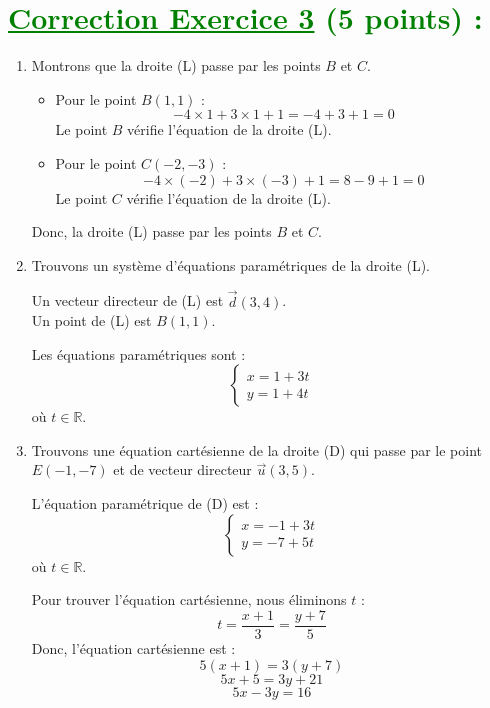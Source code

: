 \documentclass[12pt]{article}
\begin{document}
\section*{\textcolor{green}{\underline{Correction Exercice 3} (5 points) :}}
\begin{enumerate}
    \item Montrons que la droite (L) passe par les points \(B\) et \(C\).
    
    \begin{itemize}
        \item Pour le point \(B(1, 1)\) :
        \[
        -4 \times 1 + 3 \times 1 + 1 = -4 + 3 + 1 = 0
        \]
        Le point \(B\) vérifie l'équation de la droite (L).

        \item Pour le point \(C(-2, -3)\) :
        \[
        -4 \times (-2) + 3 \times (-3) + 1 = 8 - 9 + 1 = 0
        \]
        Le point \(C\) vérifie l'équation de la droite (L).
    \end{itemize}
    Donc, la droite (L) passe par les points \(B\) et \(C\).

    \item Trouvons un système d’équations paramétriques de la droite (L).

    Un vecteur directeur de (L) est \(\vec{d}(3, 4)\).\\
    Un point de (L) est \(B(1, 1)\).

    Les équations paramétriques sont :
    \[
    \begin{cases}
    x = 1 + 3t \\
    y = 1 + 4t
    \end{cases}
    \]
    où \(t \in \mathbb{R}\).

    \item Trouvons une équation cartésienne de la droite (D) qui passe par le point \(E(-1, -7)\) et de vecteur directeur \(\vec{u}(3, 5)\).

    L'équation paramétrique de (D) est :
    \[
    \begin{cases}
    x = -1 + 3t \\
    y = -7 + 5t
    \end{cases}
    \]
    où \(t \in \mathbb{R}\).

    Pour trouver l'équation cartésienne, nous éliminons \(t\) :
    \[
    t = \frac{x + 1}{3} = \frac{y + 7}{5}
    \]
    Donc, l'équation cartésienne est :
    \[
    5(x + 1) = 3(y + 7)
    \]
    \[
    5x + 5 = 3y + 21
    \]
    \[
    5x - 3y = 16
    \]


\end{enumerate}
\end{document}
